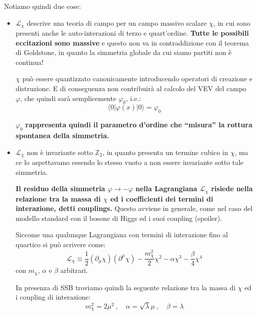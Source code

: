 \documentclass[../main.tex]{subfiles}
\begin{document}
Notiamo quindi due cose:
\begin{itemize}
    \item $\mathscr{L}_\chi$ descrive una teoria di campo per un campo massivo scalare $\chi$, in cui sono presenti anche le auto-interazioni di terzo e quart'ordine. \textbf{Tutte le possibili eccitazioni sono massive} e questo non va in contraddizione con il teorema di Goldstone, in quanto la simmetria globale da cui siamo partiti non è continua!

    $\chi$ può essere quantizzato canonicamente introducendo operatori di creazione e distruzione. E di conseguenza non contribuirà al calcolo del VEV del campo $\varphi$, che quindi sarà semplicemente $\varphi_0$, i.e.:
    \[
    \langle0|\varphi(x)|0\rangle = \varphi_0
    \]
    
    $\varphi_0$ \textbf{rappresenta quindi il parametro d'ordine che “misura” la rottura spontanea della simmetria.}

    \item $\mathscr{L}_\chi$ non è invariante sotto $\mathbb{Z}_2$, in quanto presenta un termine cubico in $\chi$, ma ce lo aspettavamo essendo lo stesso vuoto a non essere invariante sotto tale simmetria.

    \textbf{Il residuo della simmetria $\varphi\rightarrow-\varphi$ nella Lagrangiana $\mathscr{L}_\chi$ risiede nella relazione tra la massa di $\chi$ ed i coefficienti dei termini di interazione, detti couplings.} Questo avviene in generale, come nel caso del modello standard con il bosone di Higgs ed i suoi coupling (spoiler).

    Siccome una qualunque Lagrangiana con termini di interazione fino al quartico si può scrivere come:
    \begin{equation}
        \mathscr{L}_\chi\equiv \frac{1}{2}(\partial_\mu\chi)(\partial^\mu\chi) - \frac{m_\chi^2}{2}\chi^2 -\alpha\chi^3 - \frac{\beta}{4}\chi^4 
        \label{eq:general_lagragian_upto_4thorder}
    \end{equation}
    con $m_\chi$, $\alpha$ e $\beta$ arbitrari.

    In presenza di SSB troviamo quindi la seguente relazione tra la massa di $\chi$ ed i coupling di interazione:
    \begin{equation}
        m_\chi^2 = 2\mu^2~,\quad
        \alpha = \sqrt{\lambda}\mu~,\quad
        \beta = {\lambda}
        \label{eq:mass_coupling_relations}
    \end{equation}
\end{itemize}
\end{document}
